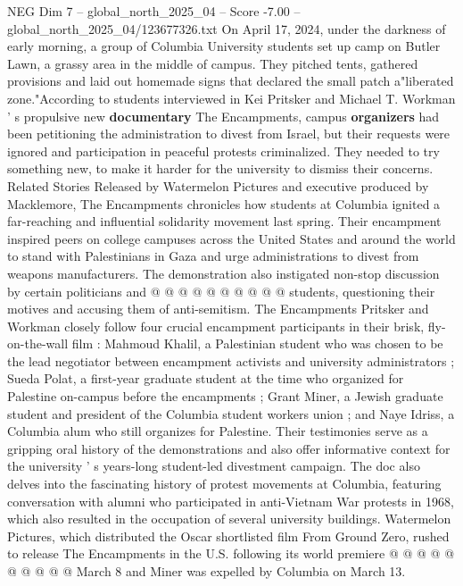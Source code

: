 \begin{textsample}{NEG Dim 7 – global\_north\_2025\_04 – Score -7.00 – global\_north\_2025\_04/123677326.txt}  \label{ex:f7_neg_098}
On April 17, 2024, under the darkness of early morning, a group of Columbia University students set up camp on Butler Lawn, a grassy area in the middle of campus.
They pitched tents, gathered provisions and laid out homemade signs that declared the small patch a"liberated zone."According to students interviewed in Kei Pritsker and Michael T.
Workman ' s propulsive new \textbf{documentary} The Encampments, campus \textbf{organizers} had been petitioning the administration to divest from Israel, but their requests were ignored and participation in peaceful protests criminalized.
They needed to try something new, to make it harder for the university to dismiss their concerns.
Related Stories Released by Watermelon Pictures and executive produced by Macklemore, The Encampments chronicles how students at Columbia ignited a far-reaching and influential solidarity movement last spring.
Their encampment inspired peers on college campuses across the United States and around the world to stand with Palestinians in Gaza and urge administrations to divest from weapons manufacturers.
The demonstration also instigated non-stop discussion by certain politicians and @ @ @ @ @ @ @ @ @ @ students, questioning their motives and accusing them of anti-semitism.
The Encampments Pritsker and Workman closely follow four crucial encampment participants in their brisk, fly-on-the-wall film : Mahmoud Khalil, a Palestinian student who was chosen to be the lead negotiator between encampment activists and university administrators ; Sueda Polat, a first-year graduate student at the time who organized for Palestine on-campus before the encampments ; Grant Miner, a Jewish graduate student and president of the Columbia student workers union ; and Naye Idriss, a Columbia alum who still organizes for Palestine.
Their testimonies serve as a gripping oral history of the demonstrations and also offer informative context for the university ' s years-long student-led divestment campaign.
The doc also delves into the fascinating history of protest movements at Columbia, featuring conversation with alumni who participated in anti-Vietnam War protests in 1968, which also resulted in the occupation of several university buildings.
Watermelon Pictures, which distributed the Oscar shortlisted film From Ground Zero, rushed to release The Encampments in the U.S. following its world premiere @ @ @ @ @ @ @ @ @ @ March 8 and Miner was expelled by Columbia on March 13.

\end{textsample}
